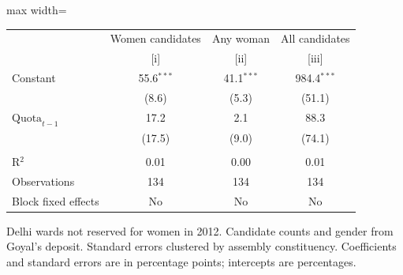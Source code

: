 
\begingroup
\centering
\scriptsize
\begin{adjustbox}{max width=\linewidth}
   \begin{threeparttable}[b]
      \begin{tabular}{lccc}
         \toprule
                               & Women candidates & Any woman    & All candidates \\
                               & [i]              & [ii]         & [iii]\\
         \midrule
         Constant              & 55.6$^{***}$     & 41.1$^{***}$ & 984.4$^{***}$\\
                               & (8.6)            & (5.3)        & (51.1)\\
         $\text{Quota}_{t-1}$  & 17.2             & 2.1          & 88.3\\
                               & (17.5)           & (9.0)        & (74.1)\\
          \\
         R$^2$                 & 0.01             & 0.00         & 0.01\\
         Observations          & 134              & 134          & 134\\
         Block fixed effects   & No               & No           & No\\
         \bottomrule
      \end{tabular}

      \begin{tablenotes}
         \item Delhi wards not reserved for women in 2012. Candidate counts and gender from Goyal's deposit. Standard errors clustered by assembly constituency. Coefficients and standard errors are in percentage points; intercepts are percentages.
      \end{tablenotes}
   \end{threeparttable}
\end{adjustbox}
\par\endgroup



